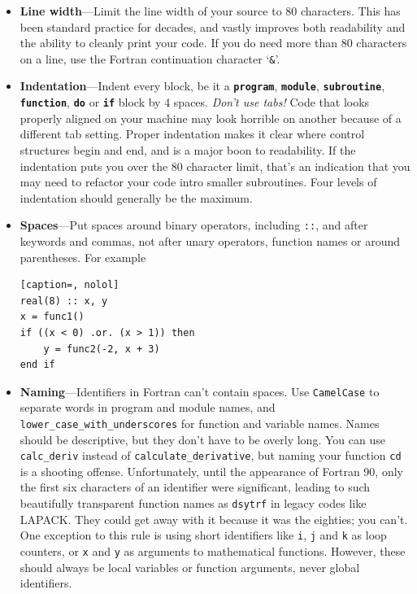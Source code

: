 \documentclass[openany,oneside]{report}
\newcommand{\keyword}[1]{\texttt{\bfseries\color{DarkBlue}#1}}
\begin{document}
\begin{itemize}
  \item\textbf{Line width}---Limit the line width of your source to 80 characters.
    This has been standard practice for decades, and vastly improves both readability and the ability to cleanly print your code.
    If you do need more than 80 characters on a line, use the Fortran continuation character `\texttt{\&}'.
  \item\textbf{Indentation}---Indent every block, be it  a \keyword{program}, \keyword{module}, \keyword{subroutine}, \keyword{function}, \keyword{do} or \keyword{if} block by 4 spaces.
    \emph{Don't use tabs!} Code that looks properly aligned on your machine may look horrible on another because of a different tab setting.
    Proper indentation makes it clear where control structures begin and end, and is a major boon to readability.
    If the indentation puts you over the 80 character limit, that's an indication that you may need to refactor your code intro smaller subroutines.
    Four levels of indentation should generally be the maximum.
  \item\textbf{Spaces}---Put spaces around binary operators, including \texttt{::}, and after keywords and commas, not after unary operators, function names or around parentheses. For example
\begin{lstlisting}[caption=, nolol]
real(8) :: x, y
x = func1()
if ((x < 0) .or. (x > 1)) then
    y = func2(-2, x + 3)
end if
\end{lstlisting}
  \item\textbf{Naming}---Identifiers in Fortran can't contain spaces.
    Use \texttt{CamelCase} to separate words in program and module names, and \texttt{lower\_case\_with\_underscores} for function and variable names.
    Names should be descriptive, but they don't have to be overly long.
    You can use \texttt{calc\_deriv} instead of \texttt{calculate\_derivative}, but naming your function \texttt{cd} is a shooting offense.
    Unfortunately, until the appearance of Fortran 90, only the first six characters of an identifier were significant, leading to such beautifully transparent function names as \texttt{dsytrf} in legacy codes like LAPACK.
    They could get away with it because it was the eighties; you can't.
    One exception to this rule is using short identifiers like \texttt{i}, \texttt{j} and \texttt{k} as loop counters, or \texttt{x} and \texttt{y} as arguments to mathematical functions.
    However, these should always be local variables or function arguments, never global identifiers.

\end{itemize}
\end{document}
